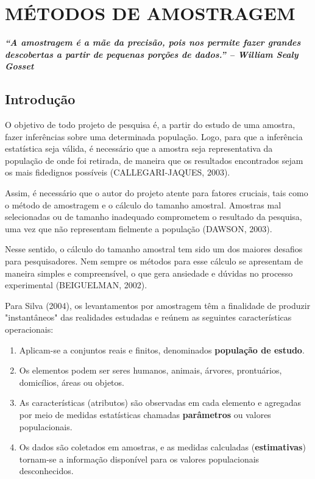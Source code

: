 \chapter{MÉTODOS DE AMOSTRAGEM}

\textbf{\textit{“A amostragem é a mãe da precisão, pois nos permite fazer grandes descobertas a partir de pequenas porções de dados.” – \textbf{William Sealy Gosset}}} \vskip0.3cm

\section{Introdução}

O objetivo de todo projeto de pesquisa é, a partir do estudo de uma amostra, fazer inferências sobre uma determinada população. Logo, para que a inferência estatística seja válida, é necessário que a amostra seja representativa da população de onde foi retirada, de maneira que os resultados encontrados sejam os mais fidedignos possíveis (CALLEGARI-JAQUES, 2003). 
\vskip0.3cm

Assim, é necessário que o autor do projeto atente para fatores cruciais, tais como o método de amostragem e o cálculo do tamanho amostral. Amostras mal selecionadas ou de tamanho inadequado comprometem o resultado da pesquisa, uma vez que não representam fielmente a população (DAWSON, 2003). \vskip0.3cm

Nesse sentido, o cálculo do tamanho amostral tem sido um dos maiores desafios para pesquisadores. Nem sempre os métodos para esse cálculo se apresentam de maneira simples e compreensível, o que gera ansiedade e dúvidas no processo experimental (BEIGUELMAN, 2002). \vskip0.3cm

Para Silva (2004), os levantamentos por amostragem têm a finalidade de produzir "instantâneos" das realidades estudadas e reúnem as seguintes características operacionais:

\begin{enumerate}
    \item[{i)}] Aplicam-se a conjuntos reais e finitos, denominados \textbf{população de estudo}.
    \item[{ii)}] Os elementos podem ser seres humanos, animais, árvores, prontuários, domicílios, áreas ou objetos.
    \item[{iii)}] As características (atributos) são observadas em cada elemento e agregadas por meio de medidas estatísticas chamadas \textbf{parâmetros} ou valores populacionais.
    \item[{iv)}] Os dados são coletados em amostras, e as medidas calculadas (\textbf{estimativas}) tornam-se a informação disponível para os valores populacionais desconhecidos.
\end{enumerate}

